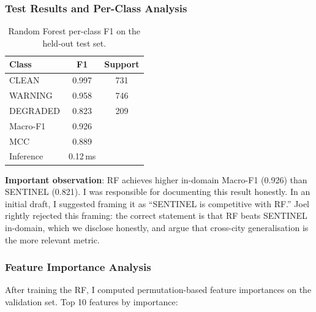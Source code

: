 \documentclass[12pt,a4paper]{article}
\begin{document}
\subsubsection{Test Results and Per-Class Analysis}

\begin{table}[H]
  \centering
  \caption{Random Forest per-class F1 on the held-out test set.}
  \begin{tabular}{lcc}
    \toprule
    \textbf{Class} & \textbf{F1} & \textbf{Support} \\
    \midrule
    CLEAN    & 0.997 & 731 \\
    WARNING  & 0.958 & 746 \\
    DEGRADED & 0.823 & 209 \\
    \midrule
    Macro-F1  & 0.926    & \\
    MCC       & 0.889    & \\
    Inference & 0.12\,ms & \\
    \bottomrule
  \end{tabular}
\end{table}

\textbf{Important observation}: RF achieves higher in-domain Macro-F1 (0.926) than
SENTINEL (0.821).
I was responsible for documenting this result honestly.
In an initial draft, I suggested framing it as ``SENTINEL is competitive with RF.''
Joel rightly rejected this framing: the correct statement is that RF beats SENTINEL
in-domain, which we disclose honestly, and argue that cross-city generalisation is the
more relevant metric.

\subsubsection{Feature Importance Analysis}

After training the RF, I computed permutation-based feature importances on the
validation set.
Top 10 features by importance:
\end{document}
